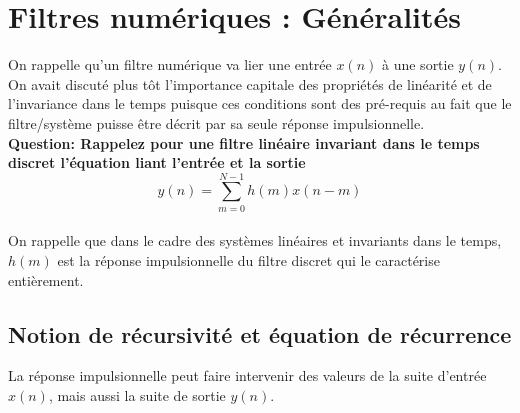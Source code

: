 \documentclass[11pt,a4paper]{article}
\begin{document}
\section{Filtres numériques : Généralités}
On rappelle qu'un filtre numérique va lier une entrée $x(n)$ à une sortie $y(n)$. On avait discuté plus tôt l'importance capitale des propriétés de linéarité et de l'invariance dans le temps puisque ces conditions sont des pré-requis au fait que le filtre/système puisse être décrit par sa seule réponse impulsionnelle.\\

\textbf{Question: Rappelez pour une filtre linéaire invariant dans le temps discret l'équation liant l'entrée et la sortie}\\

\[ y(n) = \sum_{m = 0}^{N-1} h(m) x(n-m) \]\\

On rappelle que dans le cadre des systèmes linéaires et invariants dans le temps, $h(m)$ est la réponse impulsionnelle du filtre discret qui le caractérise entièrement.


\subsection{Notion de récursivité et équation de récurrence} 
La réponse impulsionnelle peut faire intervenir des valeurs de la suite d'entrée $x(n)$, mais aussi la suite de sortie $y(n)$.\\
\end{document}

